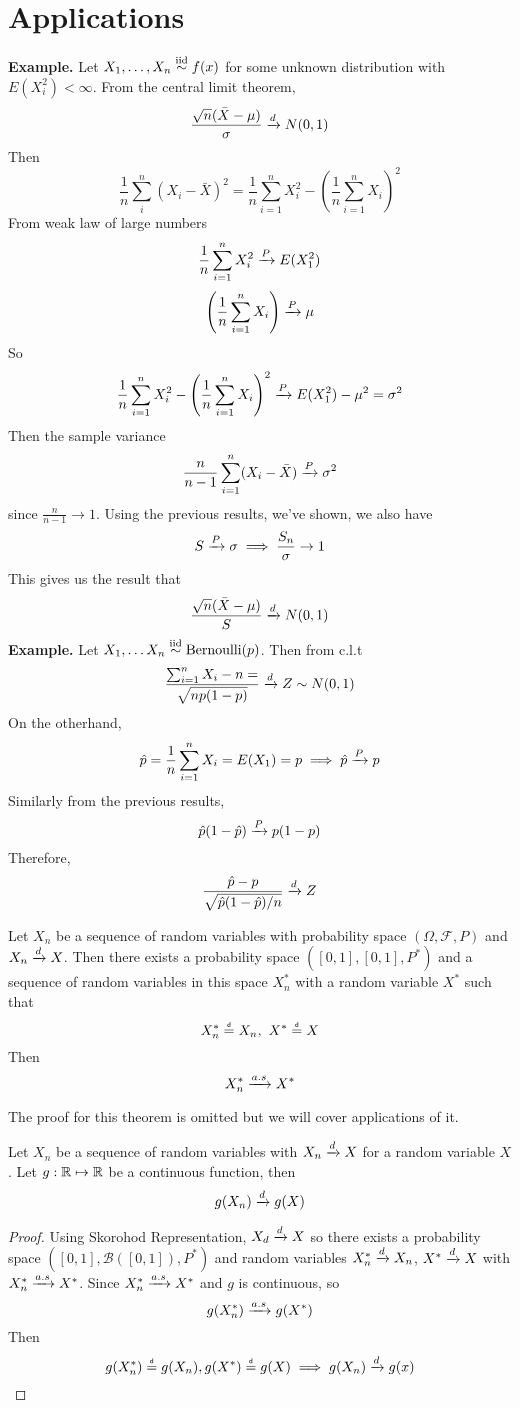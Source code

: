 \section*{Applications}
\textbf{Example.} Let $X_1, \ldots, X_n \overset{\mathrm{iid}}{\sim} f(x)$ for some unknown distribution with $E(X_i^2) < \infty$. From the central limit theorem, 
\[\frac{\sqrt{n}(\bar{X} - \mu)}{\sigma} \xrightarrow{d} N(0,1)\]
Then 
\[\frac{1}{n}\sum_{i}^n (X_i-\bar{X})^2 = \frac{1}{n}\sum_{i=1}^nX_i^2 - \left(\frac{1}{n}\sum_{i=1}^n X_i\right)^2 \]
From weak law of large numbers 
\[ \frac{1}{n}\sum_{i=1}^nX_i^2 \xrightarrow{P} E(X_1^2)\]
\[\left(\frac{1}{n}\sum_{i=1}^n X_i\right) \xrightarrow{P} \mu\]
So 
\[\frac{1}{n}\sum_{i=1}^nX_i^2 - \left(\frac{1}{n}\sum_{i=1}^n X_i\right)^2  \xrightarrow{P} E(X_1^2) - \mu^2 = \sigma^2\]
Then the sample variance 
\[\frac{n}{n-1}\sum_{i=1}^n (X_i - \bar{X}) \xrightarrow{P} \sigma^2\]
since $\frac{n}{n-1} \rightarrow 1$. Using the previous results, we've shown, we also have 
\[S \xrightarrow{P} \sigma \implies \frac{S_n}{\sigma} \rightarrow 1\]
This gives us the result that 
\[\frac{\sqrt{n}(\bar{X} - \mu)}{S} \xrightarrow{d} N(0,1)\]
\textbf{Example.} Let $X_1, \ldots X_n \overset{\mathrm{iid}}{\sim} \operatorname{Bernoulli}(p)$. Then from c.l.t
\[\frac{\sum_{i=1}^n X_i - n=}{\sqrt{np(1-p)}} \xrightarrow{d} Z \sim N(0,1)\]
On the otherhand, 
\[\hat{p} = \frac{1}{n}\sum_{i=1}^n X_i= E(X_1) = p \implies \hat{p} \xrightarrow{P} p\]
Similarly from the previous results, 
\[\hat{p}(1-\hat{p}) \xrightarrow{P} p(1-p)\]
Therefore, 
\[\frac{\hat{p} - p}{\sqrt{\hat{p}(1-\hat{p})/n}} \xrightarrow{d} Z \]
\begin{theorem}
    Let $X_n$ be a sequence of random variables with probability space $(\Omega, \mathcal{F}, P)$ and $X_n \xrightarrow{d} X$. Then there exists a probability space $([0,1], \mathcal{[0,1]}, P^*)$ and a sequence of random variables in this space $X_n^*$ with a random variable $X^*$ such that 
    \[X_n^* \eqd X_n, \ X^* \eqd X \]
    Then
    \[X_n^* \xrightarrow{a.s} X^*\]
\end{theorem}
The proof for this theorem is omitted but we will cover applications of it. 
\begin{theorem}
    Let $X_n$ be a sequence of random variables with $X_n \xrightarrow{d} X$ for a random variable $X$. Let $g: \mathbb{R} \mapsto \mathbb{R}$ be a continuous function, then 
    \[g(X_n)\xrightarrow{d} g(X)\] 
\end{theorem}

\begin{proof}
    Using Skorohod Representation, $X_d \xrightarrow{d} X$ so there exists a probability space $([0,1], \mathcal{B}([0,1]), P^*)$ and random variables $X_n^* \xrightarrow{d} X_n$, $X^*\xrightarrow{d} X$ with $X_n^* \xrightarrow{a.s} X^*$. Since $X_n^* \xrightarrow{a.s} X^*$ and $g$ is continuous, so 
    \[g(X_n^*) \xrightarrow{a.s} g(X^*)\]
    Then 
    \[g(X_n^*) \eqd g(X_n), g(X^*) \eqd g(X) \implies g(X_n) \cond g(x)\]
\end{proof}

